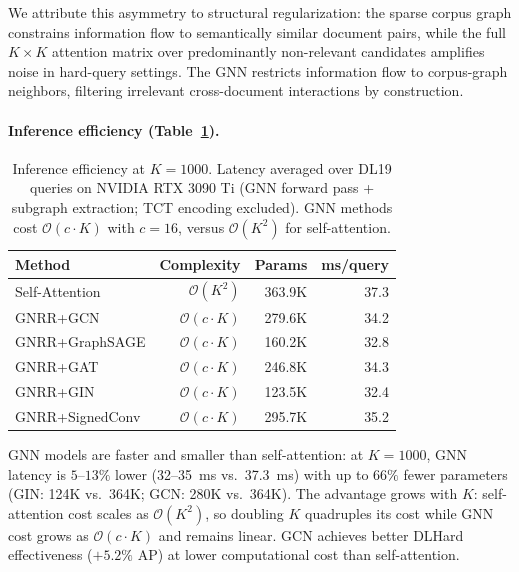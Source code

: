 \documentclass[runningheads]{llncs}
\begin{document}
We attribute this asymmetry to structural regularization: the sparse corpus graph constrains information flow to semantically similar document pairs, while the full $K\!\times\!K$ attention matrix over predominantly non-relevant candidates amplifies noise in hard-query settings. The GNN restricts information flow to corpus-graph neighbors, filtering irrelevant cross-document interactions by construction.

\paragraph{Inference efficiency (Table~\ref{tab:efficiency}).}
\begin{table}[ht]
    \centering
    \footnotesize
    \caption{Inference efficiency at $K=1000$. Latency averaged over DL19 queries on NVIDIA RTX 3090 Ti (GNN forward pass + subgraph extraction; TCT encoding excluded). GNN methods cost $\mathcal{O}(c \cdot K)$ with $c=16$, versus $\mathcal{O}(K^2)$ for self-attention.}
    \vspace{0.1cm}
    \setlength{\tabcolsep}{4pt} 
    \begin{tabular}{lrrr}
        \toprule
        \textbf{Method} & \textbf{Complexity} & \textbf{Params} & \textbf{ms/query} \\
        \midrule
        Self-Attention       & $\mathcal{O}(K^2)$         & 363.9K & 37.3 \\
        \midrule
        GNRR+GCN       & $\mathcal{O}(c \cdot K)$   & 279.6K & 34.2 \\
        GNRR+GraphSAGE & $\mathcal{O}(c \cdot K)$   & 160.2K & 32.8 \\
        GNRR+GAT       & $\mathcal{O}(c \cdot K)$   & 246.8K & 34.3 \\
        GNRR+GIN       & $\mathcal{O}(c \cdot K)$   & 123.5K & 32.4 \\
        GNRR+SignedConv & $\mathcal{O}(c \cdot K)$  & 295.7K & 35.2 \\
        \bottomrule
    \end{tabular}
    \label{tab:efficiency}
\end{table}

GNN models are faster and smaller than self-attention: at $K=1000$, GNN latency is $5$--$13\%$ lower (32--35~ms vs.\ 37.3~ms) with up to $66\%$ fewer parameters (GIN: 124K vs.\ 364K; GCN: 280K vs.\ 364K). The advantage grows with $K$: self-attention cost scales as $\mathcal{O}(K^2)$, so doubling $K$ quadruples its cost while GNN cost grows as $\mathcal{O}(c \cdot K)$ and remains linear. GCN achieves better DLHard effectiveness ($+5.2\%$ AP) at lower computational cost than self-attention.
\end{document}
